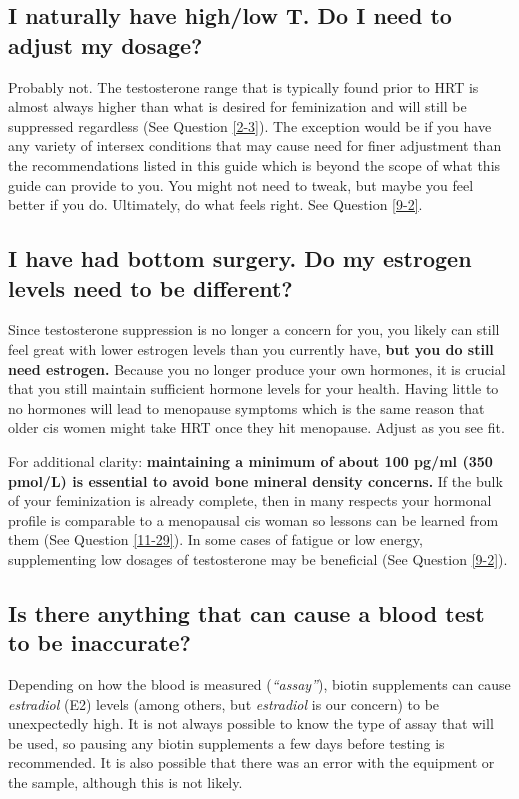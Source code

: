 \documentclass{article}
\begin{document}
\subsection{I naturally have high/low T. Do I need to adjust my dosage?}

Probably not. The testosterone range that is typically found prior to HRT is almost always higher than what is desired for feminization and will still be suppressed regardless (See Question \ref{2-3}). The exception would be if you have any variety of intersex conditions that may cause need for finer adjustment than the recommendations listed in this guide which is beyond the scope of what this guide can provide to you. You might not need to tweak, but maybe you feel better if you do. Ultimately, do what feels right. See Question \ref{9-2}.

\subsection{I have had bottom surgery. Do my estrogen levels need to be different?}

Since testosterone suppression is no longer a concern for you, you likely can still feel great with lower estrogen levels than you currently have, \textbf{but you do still need estrogen.} Because you no longer produce your own hormones, it is crucial that you still maintain sufficient hormone levels for your health. Having little to no hormones will lead to menopause symptoms which is the same reason that older cis women might take HRT once they hit menopause. Adjust as you see fit.

For additional clarity: \textbf{maintaining a minimum of about 100 pg/ml (350 pmol/L) is essential to avoid bone mineral density concerns.} If the bulk of your feminization is already complete, then in many respects your hormonal profile is comparable to a menopausal cis woman so lessons can be learned from them (See Question \ref{11-29}). In some cases of fatigue or low energy, supplementing low dosages of testosterone may be beneficial (See Question \ref{9-2}).

\subsection{Is there anything that can cause a blood test to be inaccurate?}

Depending on how the blood is measured (\textit{“assay”}), biotin supplements can cause \textit{estradiol} (E2) levels (among others, but \textit{estradiol }is our concern) to be unexpectedly high. It is not always possible to know the type of assay that will be used, so pausing any biotin supplements a few days before testing is recommended. It is also possible that there was an error with the equipment or the sample, although this is not likely.
\end{document}
